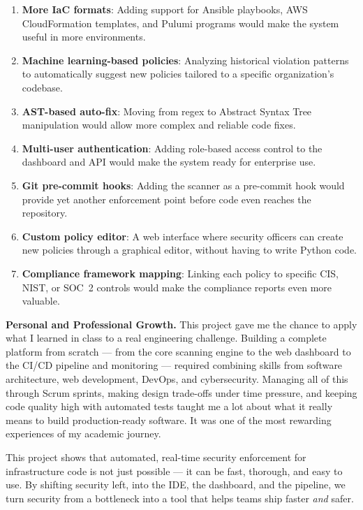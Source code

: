 \begin{enumerate}[leftmargin=1.5cm]
  \item \textbf{More IaC formats}: Adding support for Ansible playbooks, AWS CloudFormation templates, and Pulumi programs would make the system useful in more environments.
  
  \item \textbf{Machine learning-based policies}: Analyzing historical violation patterns to automatically suggest new policies tailored to a specific organization's codebase.
  
  \item \textbf{AST-based auto-fix}: Moving from regex to Abstract Syntax Tree manipulation would allow more complex and reliable code fixes.
  
  \item \textbf{Multi-user authentication}: Adding role-based access control to the dashboard and API would make the system ready for enterprise use.
  
  \item \textbf{Git pre-commit hooks}: Adding the scanner as a pre-commit hook would provide yet another enforcement point before code even reaches the repository.
  
  \item \textbf{Custom policy editor}: A web interface where security officers can create new policies through a graphical editor, without having to write Python code.
  
  \item \textbf{Compliance framework mapping}: Linking each policy to specific CIS, NIST, or SOC~2 controls would make the compliance reports even more valuable.
\end{enumerate}


\vspace{0.3cm}
\noindent\textbf{Personal and Professional Growth.}\quad
This project gave me the chance to apply what I learned in class to a real engineering challenge. Building a complete platform from scratch --- from the core scanning engine to the web dashboard to the CI/CD pipeline and monitoring --- required combining skills from software architecture, web development, DevOps, and cybersecurity. Managing all of this through Scrum sprints, making design trade-offs under time pressure, and keeping code quality high with automated tests taught me a lot about what it really means to build production-ready software. It was one of the most rewarding experiences of my academic journey.


\vspace{0.5cm}
\noindent This project shows that automated, real-time security enforcement for infrastructure code is not just possible --- it can be fast, thorough, and easy to use. By shifting security left, into the IDE, the dashboard, and the pipeline, we turn security from a bottleneck into a tool that helps teams ship faster \emph{and} safer.

